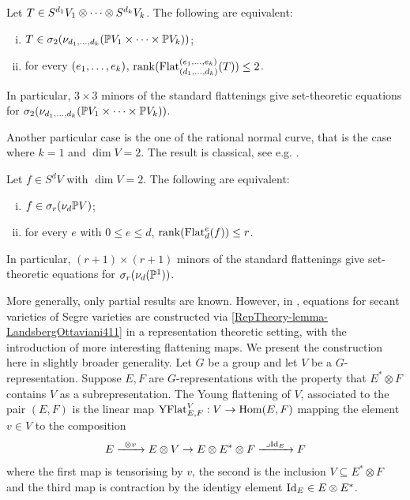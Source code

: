 \begin{theorem}
 \label{RepTheory-theorem-LandsbergManivelSigma2}
 Let $T \in  S^{d_1} V_1 \otimes \cdots \otimes S^{d_k}V_k$. The following are equivalent:
 \begin{enumerate}[(i)]
  \item $T \in \sigma_2(\nu_{d_1 , \ldots , d_k} ( \mathbb{P} V_1 \times \cdots \times \mathbb{P} V_k))$;
  \item for every $(e_1 , \ldots , e_k)$, $\mathrm{rank}( \mathrm{Flat}_{(d_1 , \ldots , d_k)}^{(e_1 , \ldots , e_k)}(T) ) \leq 2$. 
 \end{enumerate} 
 In particular, $3 \times 3$ minors of the standard flattenings give set-theoretic equations for $ \sigma_2(\nu_{d_1 , \ldots , d_k} ( \mathbb{P} V_1 \times \cdots \times \mathbb{P} V_k))$.
\end{theorem}
Another particular case is the one of the rational normal curve, that is the case where $k = 1$ and $\dim V = 2$. The result is classical, see e.g. \cite[Chapter 7]{IK99}.
\begin{theorem}
 \label{RepTheory-theorem-rationalnormalcurves}
 Let $f \in  S^{d} V$ with $\dim V = 2$. The following are equivalent:
 \begin{enumerate}[(i)]
  \item $f \in \sigma_r(\nu_{d} \mathbb{P} V)$;
  \item for every $e$ with $0 \leq e \leq d$, $\mathrm{rank}( \mathrm{Flat}_d^e(f))  \leq r$. 
 \end{enumerate} 
 In particular, $(r+1) \times (r+1)$ minors of the standard flattenings give set-theoretic equations for $\sigma_r(\nu_d(\mathbb{P}^1))$.
\end{theorem}
More generally, only partial results are known. However, in \cite{LO13}, equations for secant varieties of Segre varieties are constructed via \ref{RepTheory-lemma-LandsbergOttaviani411} in a representation theoretic setting, with the introduction of more interesting flattening maps. We present the construction here in slightly broader generality. Let $G$ be a group and let $V$ be a $G$-representation. Suppose $E,F$ are $G$-representations with the property that $E^* \otimes F$ contains $V$ as a subrepresentation. The Young flattening of $V$, associated to the pair $(E,F)$ is the linear map $\mathrm{YFlat}^V_{E,F} : V \to \operatorname{Hom}( E,F)$ mapping the element $v \in V$ to the composition
\begin{align*}
E \xto{\otimes v} E \otimes V \to E \otimes E^* \otimes F \xto{\lrcorner \Id_E} F
\end{align*}
where the first map is tensorising by $v$, the second is the inclusion $V \subseteq E^* \otimes F$ and the third map is contraction by the identigy element $\mathrm{Id}_E \in E \otimes E^*$.

